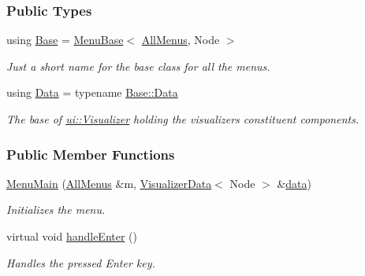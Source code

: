 \subsubsection*{Public Types}
\begin{DoxyCompactItemize}
\item 
using \hyperlink{structslb_1_1core_1_1ui_1_1MenuMain_a16decba69d312f5bc7b74a75b886199a}{Base} = \hyperlink{structslb_1_1core_1_1ui_1_1MenuBase}{Menu\+Base}$<$ \hyperlink{structslb_1_1core_1_1ui_1_1AllMenus}{All\+Menus}, Node $>$\hypertarget{structslb_1_1core_1_1ui_1_1MenuMain_a16decba69d312f5bc7b74a75b886199a}{}\label{structslb_1_1core_1_1ui_1_1MenuMain_a16decba69d312f5bc7b74a75b886199a}

\begin{DoxyCompactList}\small\item\em Just a short name for the base class for all the menus. \end{DoxyCompactList}\item 
using \hyperlink{structslb_1_1core_1_1ui_1_1MenuMain_ab7e92fb98d65154ba23c7eafe79b02fe}{Data} = typename \hyperlink{structslb_1_1core_1_1ui_1_1MenuBase_a1803444111552d2e5b87671292dd74cb}{Base\+::\+Data}\hypertarget{structslb_1_1core_1_1ui_1_1MenuMain_ab7e92fb98d65154ba23c7eafe79b02fe}{}\label{structslb_1_1core_1_1ui_1_1MenuMain_ab7e92fb98d65154ba23c7eafe79b02fe}

\begin{DoxyCompactList}\small\item\em The base of \hyperlink{structslb_1_1core_1_1ui_1_1Visualizer}{ui\+::\+Visualizer} holding the visualizer\textquotesingle{}s constituent components. \end{DoxyCompactList}\end{DoxyCompactItemize}
\subsubsection*{Public Member Functions}
\begin{DoxyCompactItemize}
\item 
\hyperlink{structslb_1_1core_1_1ui_1_1MenuMain_af8cc9f62eb407b07ce92167d23bba6b0}{Menu\+Main} (\hyperlink{structslb_1_1core_1_1ui_1_1AllMenus}{All\+Menus} \&m, \hyperlink{structslb_1_1core_1_1ui_1_1VisualizerData}{Visualizer\+Data}$<$ Node $>$ \&\hyperlink{structslb_1_1core_1_1ui_1_1MenuBase_a475d9457affb2b4fc96737e269d6911f}{data})
\begin{DoxyCompactList}\small\item\em Initializes the menu. \end{DoxyCompactList}\item 
virtual void \hyperlink{structslb_1_1core_1_1ui_1_1MenuMain_afa87ec1ec5c02b4865371a3bce5b88b4}{handle\+Enter} ()\hypertarget{structslb_1_1core_1_1ui_1_1MenuMain_afa87ec1ec5c02b4865371a3bce5b88b4}{}\label{structslb_1_1core_1_1ui_1_1MenuMain_afa87ec1ec5c02b4865371a3bce5b88b4}

\begin{DoxyCompactList}\small\item\em Handles the pressed Enter key. \end{DoxyCompactList}\end{DoxyCompactItemize}
